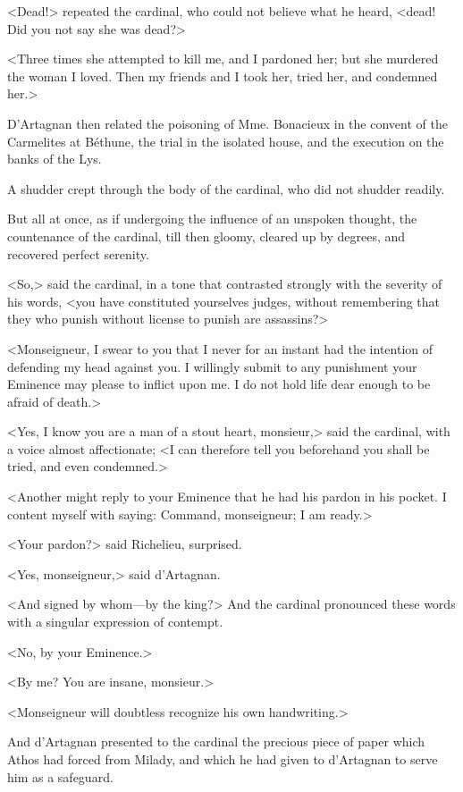 <Dead!> repeated the cardinal, who could not believe what he heard, <dead! Did you not say she was dead?> 

<Three times she attempted to kill me, and I pardoned her; but she murdered the woman I loved. Then my friends and I took her, tried her, and condemned her.> 

D'Artagnan then related the poisoning of Mme. Bonacieux in the convent of the Carmelites at Béthune, the trial in the isolated house, and the execution on the banks of the Lys. 

A shudder crept through the body of the cardinal, who did not shudder readily. 

But all at once, as if undergoing the influence of an unspoken thought, the countenance of the cardinal, till then gloomy, cleared up by degrees, and recovered perfect serenity. 

<So,> said the cardinal, in a tone that contrasted strongly with the severity of his words, <you have constituted yourselves judges, without remembering that they who punish without license to punish are assassins?> 

<Monseigneur, I swear to you that I never for an instant had the intention of defending my head against you. I willingly submit to any punishment your Eminence may please to inflict upon me. I do not hold life dear enough to be afraid of death.> 

<Yes, I know you are a man of a stout heart, monsieur,> said the cardinal, with a voice almost affectionate; <I can therefore tell you beforehand you shall be tried, and even condemned.> 

<Another might reply to your Eminence that he had his pardon in his pocket. I content myself with saying: Command, monseigneur; I am ready.> 

<Your pardon?> said Richelieu, surprised. 

<Yes, monseigneur,> said d'Artagnan. 

<And signed by whom---by the king?> And the cardinal pronounced these words with a singular expression of contempt. 

<No, by your Eminence.> 

<By me? You are insane, monsieur.> 

<Monseigneur will doubtless recognize his own handwriting.> 

And d'Artagnan presented to the cardinal the precious piece of paper which Athos had forced from Milady, and which he had given to d'Artagnan to serve him as a safeguard. 

